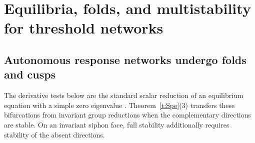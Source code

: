 \section{Equilibria, folds, and multistability for threshold networks}\label{s:KBmulti}

\subsection{Autonomous response networks undergo folds and cusps}
The derivative tests below are the standard scalar reduction of an
equilibrium equation with a simple zero eigenvalue
\cite{kuznetsov2004}. Theorem~\ref{t:Spe}(3) transfers these bifurcations from invariant
group reductions when the complementary directions are stable.
On an invariant siphon face,
full stability additionally requires stability of the absent directions.

